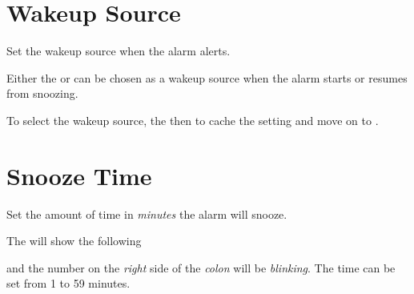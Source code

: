 \section{Wakeup Source} 

Set the wakeup source when the alarm alerts.

\par\medskip

Either the  or  can be chosen as a wakeup source when the alarm
starts or resumes from snoozing. 


To select the wakeup source,  the  then 
to cache the setting and move on to .


\section{Snooze Time} 

Set the amount of time in \textit{minutes} the alarm will snooze.

\par\medskip

The  will show the following


and the number on the \textit{right} side of the \textit{colon} will be
\textit{blinking}.  The time can be set from \num{1} to \num{59} minutes.

\par\medskip

